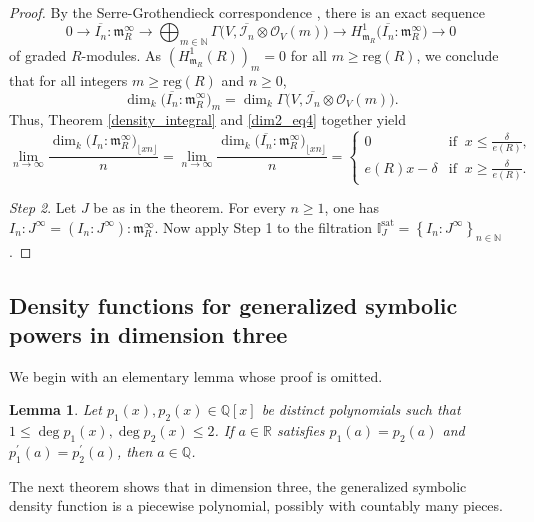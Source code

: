 \documentclass[12pt,a4paper]{amsart}
\theoremstyle{plain}
\newtheorem{lemma}[theorem]{Lemma}
\theoremstyle{definition}
\numberwithin{equation}{theorem}
\newcommand{\mm}{\mathfrak{m}}
\begin{document}
\begin{proof}
By the Serre-Grothendieck correspondence \cite[Proposition 2.2]{Har67}, there is an exact sequence $$0 \to \overline{I_n} \colon \mathfrak{m}_R^{\infty} \to \bigoplus_{m\in\mathbb{N}}\Gamma\big(V,\overline{\mathcal{I}_n}\otimes\mathcal{O}_V(m)\big) \to H^1_{\mathfrak{m}_R}\big(\overline{I_n} \colon \mathfrak{m}_R^{\infty}\big) \to 0$$ of graded $R$-modules. As $\left(H^1_{\mathfrak{m}_R}(R)\right)_m = 0$ for all $m\geq \mathrm{reg}(R)$, we conclude that for all integers $m\geq \mathrm{reg}(R)$ and $n\geq 0$, $$\dim_k{\big(\overline{I_n} \colon \mathfrak{m}_R^{\infty}\big)}_m = \dim_k\Gamma\big(V,\overline{\mathcal{I}_n}\otimes\mathcal{O}_V(m)\big).$$ Thus, Theorem \ref{density_integral} and \eqref{dim2_eq4} together yield $$\lim_{n\to\infty}\dfrac{\dim_k{\big(I_n \colon \mathfrak{m}_R^{\infty}\big)}_{\lfloor xn\rfloor}}{n} = \lim_{n\to\infty}\dfrac{\dim_k{\big(\overline{I_n} \colon \mathfrak{m}_R^{\infty}\big)}_{\lfloor xn\rfloor}}{n} = \begin{cases}
    0 & \text{if}\;\;x\leq \frac{\delta}{e(R)},\\
    e(R)x-\delta & \text{if}\;\;x\geq \frac{\delta}{e(R)}.
   \end{cases}$$

\emph{Step 2}. Let $J$ be as in the theorem. For every $n \geq 1$, one has $I_n \colon J^{\infty} = \left(I_n \colon J^{\infty}\right) \colon \mm_R^{\infty}$. Now apply Step 1 to the filtration $\mathbb{I}^{\mathrm{sat}}_J=\left\{I_n \colon J^{\infty}\right\}_{n\in\mathbb{N}}$.
\end{proof}

\subsection{Density functions for generalized symbolic powers in dimension three}

We begin with an elementary lemma whose proof is omitted.

\begin{lemma}\label{lemma_elementary}
Let $p_1(x), p_2(x) \in \mathbb{Q}[x]$ be distinct polynomials such that $1\leq \deg p_1(x), \deg p_2(x) \leq 2$. If $a\in \mathbb{R}$ satisfies $p_1(a) = p_2(a)$ and $p^{\prime}_1(a) = p^{\prime}_2(a)$, then $a\in \mathbb{Q}$.
\end{lemma}

The next theorem shows that in dimension three, the generalized symbolic density function is a piecewise polynomial, possibly with countably many pieces.
\end{document}
